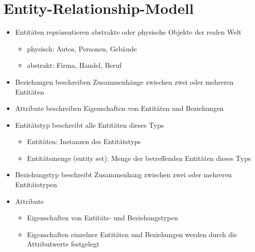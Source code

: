 \section{Entity-Relationship-Modell}\label{erm}

\begin{frame}{\insertsection}
\begin{itemize}
	\item Entit\"aten	repr\"asentieren abstrakte oder physische Objekte der realen Welt
	\begin{itemize}
		\item physisch: Autos, Personen, Geb\"aude
		\item abstrakt: Firma, Handel, Beruf
	\end{itemize}
	\item Beziehungen beschreiben Zusammenh\"ange zwischen zwei oder mehreren Entit\"aten
	\item Attribute beschreiben Eigenschaften von Entit\"aten und Beziehungen
\end{itemize}
\end{frame}

\begin{frame}{\insertsection}
\begin{itemize}
	\item Entit\"atstyp beschreibt alle Entit\"aten dieses Typs
	\begin{itemize}
		\item Entit\"aten: Instanzen des Entit\"atstyps
		\item Entit\"atsmenge (entity set): Menge der betreffenden Entit\"aten dieses Typs
  \end{itemize}
	\item Beziehungstyp beschreibt Zusammenhang zwischen zwei oder mehreren Entit\"atstypen
	\item Attribute
	\begin{itemize}
		\item Eigenschaften von Entit\"ats- und Beziehungstypen
		\item Eigenschaften einzelner Entit\"aten und Beziehungen werden durch die Attributwerte festgelegt 
	\end{itemize}
\end{itemize}
\end{frame}

